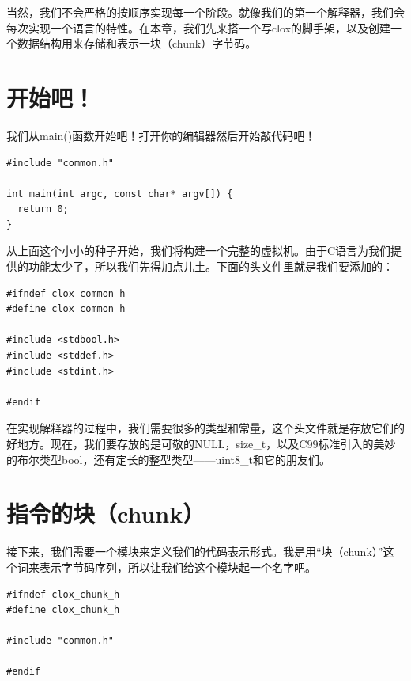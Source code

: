 \documentclass[cn,10pt,math=newtx,citestyle=gb7714-2015,bibstyle=gb7714-2015]{elegantbook}
\newenvironment{code}{\captionsetup{type=listing}}{}
\begin{document}
当然，我们不会严格的按顺序实现每一个阶段。就像我们的第一个解释器，我们会每次实现一个语言的特性。在本章，我们先来搭一个写clox的脚手架，以及创建一个数据结构用来存储和表示一块（chunk）字节码。

\section{开始吧！}

我们从main()函数开始吧！打开你的编辑器然后开始敲代码吧！

\begin{code}
\begin{verbatim}
#include "common.h"

int main(int argc, const char* argv[]) {
  return 0;
}
\end{verbatim}
\end{code}

从上面这个小小的种子开始，我们将构建一个完整的虚拟机。由于C语言为我们提供的功能太少了，所以我们先得加点儿土。下面的头文件里就是我们要添加的：

\begin{code}
\begin{verbatim}
#ifndef clox_common_h
#define clox_common_h

#include <stdbool.h>
#include <stddef.h>
#include <stdint.h>

#endif
\end{verbatim}
\end{code}

在实现解释器的过程中，我们需要很多的类型和常量，这个头文件就是存放它们的好地方。现在，我们要存放的是可敬的NULL，size\_t，以及C99标准引入的美妙的布尔类型bool，还有定长的整型类型——uint8\_t和它的朋友们。

\section{指令的块（chunk）}

接下来，我们需要一个模块来定义我们的代码表示形式。我是用“块（chunk）”这个词来表示字节码序列，所以让我们给这个模块起一个名字吧。

\begin{code}
\begin{verbatim}
#ifndef clox_chunk_h
#define clox_chunk_h

#include "common.h"

#endif
\end{verbatim}
\end{code}
\end{document}
